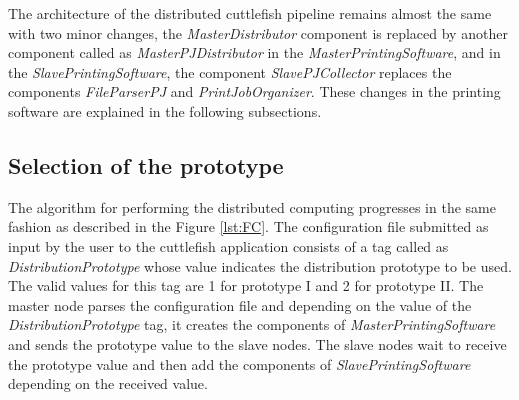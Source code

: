 The architecture of the distributed cuttlefish pipeline remains almost the same with two minor changes, the \textit{MasterDistributor} component is replaced by another component called as \textit{MasterPJDistributor} in the \textit{MasterPrintingSoftware}, and in the \textit{SlavePrintingSoftware}, the component \textit{SlavePJCollector} replaces the components \textit{FileParserPJ} and \textit{PrintJobOrganizer}. These changes in the printing software are explained in the following subsections. 

\subsection{Selection of the prototype}

The algorithm for performing the distributed computing progresses in the same fashion as described in the Figure \ref{lst:FC}. The configuration file submitted as input by the user to the cuttlefish application consists of a tag called as \textit{DistributionPrototype} whose value indicates the distribution prototype to be used. The valid values for this tag are 1 for prototype I and 2 for prototype II. The master node parses the configuration file and depending on the value of the \textit{DistributionPrototype} tag, it creates the components of \textit{MasterPrintingSoftware} and sends the prototype value to the slave nodes. The slave nodes wait to receive the prototype value and then add the components of \textit{SlavePrintingSoftware} depending on the received value. \newline

